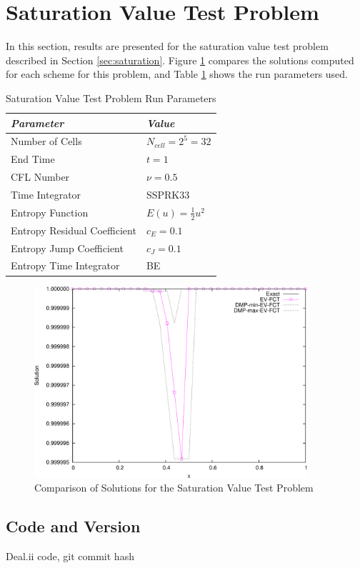 \section{Saturation Value Test Problem}

In this section, results are presented for the saturation value test
problem described in Section \ref{sec:saturation}.
Figure \ref{fig:saturation} compares the solutions computed
for each scheme for this problem, and
Table \ref{tab:saturation_run_parameters} shows the run parameters used.
\begin{table}[h]\caption{Saturation Value Test Problem Run Parameters}
\label{tab:saturation_run_parameters}
\centering
\begin{tabular}{l l}\toprule
\emph{Parameter} & \emph{Value}\\\midrule
Number of Cells & $N_{cell} = 2^5 = 32$\\
End Time & $t = 1$\\
CFL Number & $\nu = 0.5$\\
Time Integrator & SSPRK33\\\midrule
Entropy Function & $E(u) = \frac{1}{2}u^2$\\
Entropy Residual Coefficient & $c_E = 0.1$\\
Entropy Jump Coefficient & $c_J = 0.1$\\
Entropy Time Integrator & BE\\
\bottomrule\end{tabular}
\end{table}
\begin{figure}[h]
   \centering
   \includegraphics[width=0.9\textwidth]{saturation/saturation.pdf}
   \caption{Comparison of Solutions for the Saturation Value Test Problem}
   \label{fig:saturation}
\end{figure}
\subsection{Code and Version}
Deal.ii code, git commit hash 

